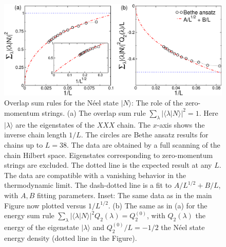 \documentclass[11pt]{iopart}
\begin{document}
\begin{figure}[t]
\begin{center}
\includegraphics[width=.9\textwidth]{./draft_figs/Neel}
\end{center}
\caption{Overlap sum rules for the N\'eel state $|N\rangle$: The role of 
 the zero-momentum strings. (a) The overlap sum rule $\sum_{\lambda}|
 \langle\lambda|N\rangle|^2=1$. Here $|\lambda\rangle$ are the eigenstates  
 of the $XXX$ chain. The $x$-axis shows the inverse chain length $1/L$. 
 The circles are Bethe ansatz results for chains up to $L=38$. The data  
 are obtained by  a full scanning of the chain Hilbert space. Eigenstates  
 corresponding to zero-momentum strings are excluded. The dotted line is 
 the expected result at any $L$. The data are compatible with a vanishing 
 behavior in the thermodynamic limit. The dash-dotted line is a fit to 
 $A/L^{1/2}+B/L$, with $A,B$ fitting parameters. Inset: The same data as 
 in the main Figure now plotted versus $1/L^{1/2}$. (b) 
 The same as in (a) for the energy sum rule $\sum_{\lambda}|\langle
 \lambda|N\rangle|^2Q_2(\lambda)=Q_2^{(0)}$, with $Q_2(\lambda)$ the 
 energy of the eigenstate $|\lambda\rangle$ and $Q_2^{(0)}/L=-1/2$ the 
 N\'eel state energy density (dotted line in the Figure). 
}
\label{fig1:neel-sr}
\end{figure}
\end{document}
